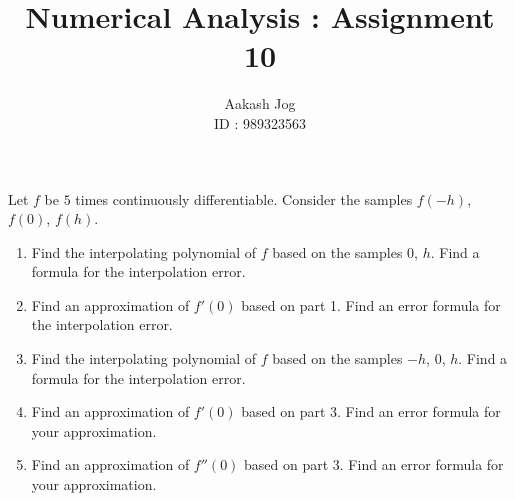 \documentclass[fleqn, a4paper, 11pt, oneside, reqno]{amsart}
\title{Numerical Analysis : Assignment 10}
\author
{
	Aakash Jog\\
	ID : 989323563
}
\date{\formatdate{29}{12}{2015}}
\theoremstyle{definition}
\theoremstyle{theorem}
\begin{document}

\maketitle

\begin{question}
	Let $f$ be $5$ times continuously differentiable.
	Consider the samples $f(-h)$, $f(0)$, $f(h)$.
	\begin{enumerate}
		\item
			Find the interpolating polynomial of $f$ based on the samples $0$, $h$.
			Find a formula for the interpolation error.
		\item
			Find an approximation of $f'(0)$ based on part 1.
			Find an error formula for the interpolation error.
		\item
			Find the interpolating polynomial of $f$ based on the samples $-h$, $0$, $h$.
			Find a formula for the interpolation error.
		\item
			Find an approximation of $f'(0)$ based on part 3.
			Find an error formula for your approximation.
		\item
			Find an approximation of $f''(0)$ based on part 3.
			Find an error formula for your approximation.
	\end{enumerate}
\end{question}
\end{document}
